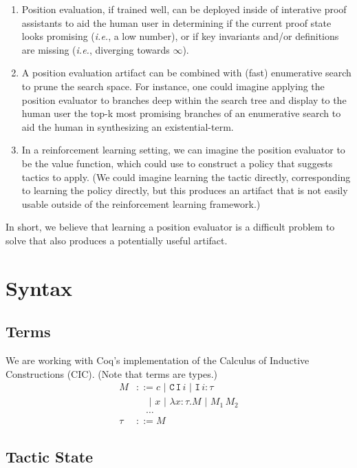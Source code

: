 \documentclass{article}
\newcommand\ie{\textit{i.e.}}
\newcommand\bnfsep{\,\, | \,\,}
\newcommand\typ{\tau}
\begin{document}
\begin{enumerate}
\item Position evaluation, if trained well, can be deployed inside of
  interative proof assistants to aid the human user in determining if
  the current proof state looks promising (\ie, a low number), or if
  key invariants and/or definitions are missing (\ie, diverging towards
  $\infty$).
\item A position evaluation artifact can be combined with (fast)
  enumerative search to prune the search space. For instance, one
  could imagine applying the position evaluator to branches deep
  within the search tree and display to the human user the top-k most
  promising branches of an enumerative search to aid the human in
  synthesizing an existential-term.
\item In a reinforcement learning setting, we can imagine the position
  evaluator to be the value function, which could use to construct a
  policy that suggests tactics to apply. (We could imagine learning
  the tactic directly, corresponding to learning the policy directly,
  but this produces an artifact that is not easily usable outside of
  the reinforcement learning framework.)
\end{enumerate}
In short, we believe that learning a position evaluator is a difficult
problem to solve that also produces a potentially useful artifact.


  
\section{Syntax}

\subsection{Terms}

We are working with Coq's implementation of the Calculus of Inductive
Constructions (CIC). (Note that terms are types.)
\begin{align*}
  M & ::= c \bnfsep \texttt{C} \, \texttt{I} \, i \bnfsep \texttt{I} \, i: \typ \\
  & \quad \bnfsep x \bnfsep \lambda x: \typ. M \bnfsep M_1 \, M_2 \\
  & \quad \dots \\
  \typ & ::= M
\end{align*}


\subsection{Tactic State}
\end{document}

